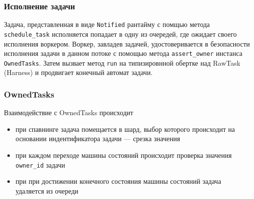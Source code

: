 \subsubsection{Исполнение задачи}

Задача, представленная в виде \verb|Notified| рантайму с помщью метода \verb|schedule_task| исполняется попадает в одну из очередей, где ожидает своего исполнения воркером. Воркер, завладев задачей, удостоверивается в безопасности исполнения задачи в данном потоке с помощью метода \verb|assert_owner| инстанса \verb|OwnedTasks|. Затем вызвает метод \verb|run| на типизировнной обертке над RawTask (Harness) и продвигает конечный автомат задачи.

\subsubsection{OwnedTasks}

Взаимодействие с OwnedTasks происходит

\begin{itemize}
    \item при спавнинге задача помещается в шард, выбор которого происходит на основании индентификатора задачи --- срезка значения
    \item при каждом переходе машины состояний происходит проверка значения \verb|owner_id| задачи
    \item при при достижении конечного состояния машины состояний задача удаляется из очереди
\end{itemize}








